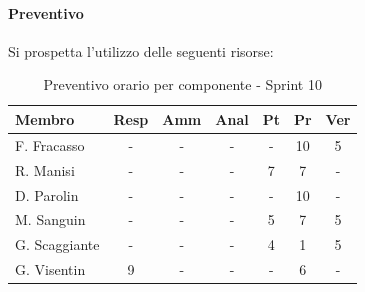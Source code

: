 \documentclass[a4paper,12pt]{article}
\begin{document}
\paragraph{Preventivo}
Si prospetta l'utilizzo delle seguenti risorse:

\begin{table}[H]
    \centering
    \renewcommand{\arraystretch}{1.3}
    \small 
    \begin{tabularx}{\textwidth}{|l|C|C|C|C|C|C|}
        \hline
        \textbf{Membro} & \textbf{Resp} & \textbf{Amm} & \textbf{Anal} & \textbf{Pt} & \textbf{Pr} & \textbf{Ver} \\
        \hline
        F. Fracasso & - & - & - & - & 10 & 5 \\
        \hline
        R. Manisi & - & - & - & 7 & 7 & - \\
        \hline
        D. Parolin & - & - & - & - & 10 & - \\
        \hline
        M. Sanguin & - & - & - & 5 & 7 & 5 \\
        \hline
        G. Scaggiante & - & - & - & 4 & 1 & 5 \\
        \hline
        G. Visentin & 9 & - & - & - & 6 & - \\
        \hline
    \end{tabularx}
    \caption{Preventivo orario per componente - Sprint 10}
    \label{tab:preventivo_sprint10}
\end{table}
\end{document}
